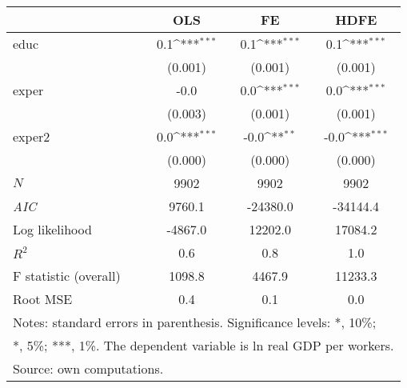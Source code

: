 {
\def\sym#1{\ifmmode^{#1}\else\(^{#1}\)\fi}
\begin{tabular}{l*{3}{c}}
\hline\hline
            &\multicolumn{1}{c}{OLS}&\multicolumn{1}{c}{FE}&\multicolumn{1}{c}{HDFE}\\
\hline
educ        &         0.1\sym{***}&         0.1\sym{***}&         0.1\sym{***}\\
            &     (0.001)         &     (0.001)         &     (0.001)         \\
[1em]
exper       &        -0.0         &         0.0\sym{***}&         0.0\sym{***}\\
            &     (0.003)         &     (0.001)         &     (0.001)         \\
[1em]
exper2      &         0.0\sym{***}&        -0.0\sym{**} &        -0.0\sym{***}\\
            &     (0.000)         &     (0.000)         &     (0.000)         \\
\hline
\(N\)       &        9902         &        9902         &        9902         \\
\textit{AIC}&      9760.1         &    -24380.0         &    -34144.4         \\
Log likelihood&     -4867.0         &     12202.0         &     17084.2         \\
$R^{2}$     &         0.6         &         0.8         &         1.0         \\
F statistic (overall)&      1098.8         &      4467.9         &     11233.3         \\
Root MSE    &         0.4         &         0.1         &         0.0         \\
\hline\hline
\multicolumn{4}{l}{\footnotesize Notes: standard errors in parenthesis. Significance levels: *, 10\%;}\\
\multicolumn{4}{l}{\footnotesize **, 5\%; ***, 1\%. The dependent variable is ln real GDP per workers.}\\
\multicolumn{4}{l}{\footnotesize Source: own computations.}\\
\end{tabular}
}

